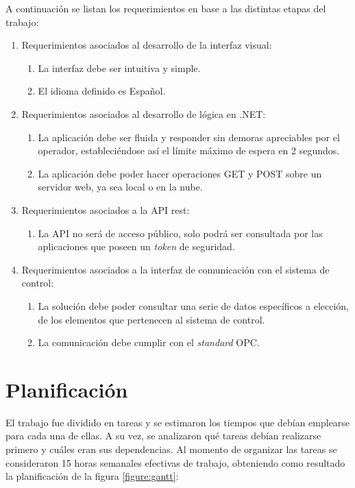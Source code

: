 A continuación se listan los requerimientos en base a las distintas etapas del trabajo:

\begin{enumerate}
\item Requerimientos asociados al desarrollo de la interfaz visual:
	\begin{enumerate}
	\item La interfaz debe ser intuitiva y simple.
	\item El idioma definido es Español.
	\end{enumerate}
\item Requerimientos asociados al desarrollo de lógica en .NET:
	\begin{enumerate}
	\item La aplicación debe ser fluida y responder sin demoras apreciables por el operador, estableciéndose así el límite máximo de espera en 2 segundos.
	\item La aplicación debe poder hacer operaciones GET y POST sobre un servidor web, ya sea local o en la nube.
	\end{enumerate}
\item Requerimientos asociados a la API rest:
	\begin{enumerate}
	\item La API no será de acceso público, solo podrá ser consultada por las aplicaciones que poseen un \textit{token} de seguridad.
	\end{enumerate}
\item Requerimientos asociados a la interfaz de comunicación con el sistema de control:	
	\begin{enumerate}	
	\item La solución debe poder consultar una serie de datos específicos a elección, de los elementos que pertenecen al sistema de control.
	\item La comunicación debe cumplir con el \textit{standard} OPC.
	\end{enumerate}
\end{enumerate}

\section{Planificación}

El trabajo fue dividido en tareas y se estimaron los tiempos que debían emplearse para cada una de ellas. A su vez, se analizaron qué tareas debían realizarse primero y cuáles eran sus dependencias. Al momento de organizar las tareas se consideraron 15 horas semanales efectivas de trabajo, obteniendo como resultado la planificación de la figura \ref{figure:gantt}:

